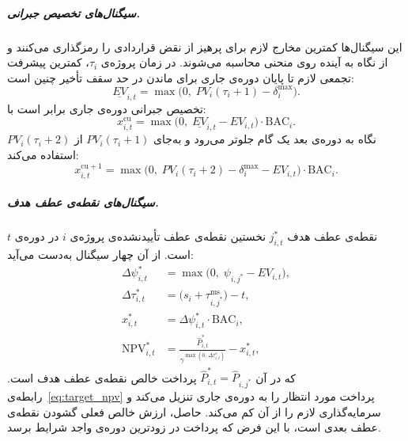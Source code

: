 \subparagraph{سیگنال‌های تخصیص جبرانی.} این سیگنال‌ها کمترین مخارج
لازم برای پرهیز از نقض قراردادی را رمزگذاری می‌کنند و از نگاه به آینده
روی منحنی  محاسبه می‌شوند. در زمان پروژه‌ی $\tau_i$، کمترین
پیشرفت تجمعی لازم تا پایان دوره‌ی جاری برای ماندن در حد سقف تأخیر
چنین است:
\begin{equation}
  \underline{EV}_{i,t}
    = \max\!\bigl(0,\; PV_i(\tau_i + 1) - \delta^{\max}_i\bigr).
  \label{eq:min_prog}
\end{equation}
تخصیص جبرانی دوره‌ی جاری برابر است با:
\begin{equation}
  x^{\mathrm{cu}}_{i,t}
    = \max\!\bigl(0,\; \underline{EV}_{i,t} - EV_{i,t}\bigr)
      \cdot \mathrm{BAC}_i.
  \label{eq:catchup}
\end{equation}
نگاه به دوره‌ی بعد یک گام جلوتر می‌رود و به‌جای $PV_i(\tau_i + 1)$ از
$PV_i(\tau_i + 2)$ استفاده می‌کند:
\begin{equation}
  x^{\mathrm{cu}+1}_{i,t}
    = \max\!\bigl(0,\; PV_i(\tau_i + 2) - \delta^{\max}_i
      - EV_{i,t}\bigr) \cdot \mathrm{BAC}_i.
  \label{eq:catchup_next}
\end{equation}

\subparagraph{سیگنال‌های نقطه‌ی عطف هدف.} نقطه‌ی عطف هدف $j^*_{i,t}$
نخستین نقطه‌ی عطف تأییدنشده‌ی پروژه‌ی $i$ در دوره‌ی $t$ است. از آن چهار
سیگنال به‌دست می‌آید:
\begin{align}
  \Delta\psi^*_{i,t}
    &= \max\!\bigl(0,\; \psi_{i,j^*} - EV_{i,t}\bigr),
  \label{eq:target_pg} \\
  \Delta\tau^*_{i,t}
    &= \bigl(s_i + \tau^{\mathrm{ms}}_{i,j^*}\bigr) - t,
  \label{eq:target_tg} \\
  x^*_{i,t}
    &= \Delta\psi^*_{i,t} \cdot \mathrm{BAC}_i,
  \label{eq:target_alloc} \\
  \mathrm{NPV}^*_{i,t}
    &= \frac{\hat{P}^*_{i,t}}
            {\gamma^{\max(0,\,\Delta\tau^*_{i,t})}}
       - x^*_{i,t},
  \label{eq:target_npv}
\end{align}
که در آن $\hat{P}^*_{i,t} = \hat{P}_{i,j^*}$ پرداخت خالص نقطه‌ی عطف
هدف است. رابطه‌ی~\eqref{eq:target_npv} پرداخت مورد انتظار را به دوره‌ی
جاری تنزیل می‌کند و سرمایه‌گذاری لازم را از آن کم می‌کند. حاصل، ارزش
خالص فعلی گشودن نقطه‌ی عطف بعدی است، با این فرض که پرداخت در زودترین
دوره‌ی واجد شرایط برسد.

